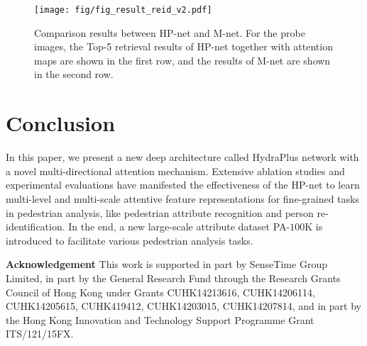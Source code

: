\documentclass[10pt,twocolumn,letterpaper]{article}
\begin{document}
\begin{figure}[t]
\small
\centering
\texttt{[image: fig/fig\_result\_reid\_v2.pdf]}
\caption{
Comparison results between HP-net and M-net. For the probe images, the Top-5 retrieval results of HP-net together with attention maps are shown in the first row, and the results of M-net are shown in the second row.
}
\label{fig:result_reid}
\end{figure}



\section{Conclusion}
\label{sec:conclusion}
\vspace{-0.1cm}
In this paper, we present a new deep architecture called HydraPlus network with a novel multi-directional attention mechanism.
Extensive ablation studies and experimental evaluations have manifested the effectiveness of the HP-net to learn multi-level and multi-scale attentive feature representations for fine-grained tasks in pedestrian analysis, like pedestrian attribute recognition and person re-identification.
In the end, a new large-scale attribute dataset PA-$100$K is introduced to facilitate various pedestrian analysis tasks.

\vspace{+5pt}
\noindent\textbf{Acknowledgement} This work is supported in part by SenseTime Group Limited, in part by the General Research Fund through the Research Grants Council of Hong Kong under Grants CUHK14213616, CUHK14206114, CUHK14205615, CUHK419412, CUHK14203015, CUHK14207814, and in part by the Hong Kong Innovation and Technology Support Programme Grant ITS/121/15FX.





{\small


}
\end{document}
